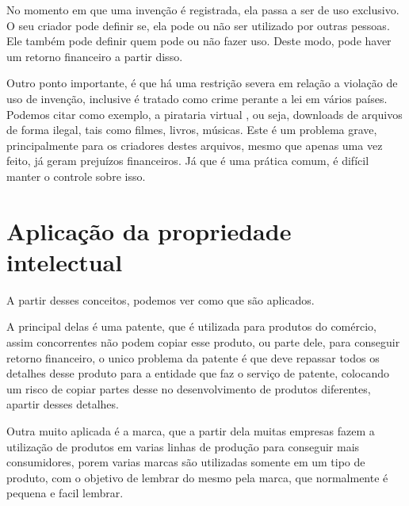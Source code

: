\documentclass[12pt]{article}
\begin{document}
No momento em que uma invenção é registrada, ela passa a ser de uso exclusivo. O seu criador pode definir se, ela pode ou não ser utilizado por outras pessoas. Ele também pode definir quem pode ou não fazer uso. Deste modo, pode haver um retorno financeiro a partir disso.

Outro ponto importante, é que há uma restrição severa em relação a violação de uso de invenção, inclusive é tratado como crime perante a lei em vários países. Podemos citar como exemplo, a pirataria virtual \cite{PIRATE}, ou seja, downloads de arquivos de forma ilegal, tais como filmes, livros, músicas. Este é um problema grave, principalmente para os criadores destes arquivos, mesmo que apenas uma vez feito, já geram prejuízos financeiros. Já que é uma prática comum, é difícil manter o controle sobre isso.

\section{Aplicação da propriedade intelectual} \label{sec:aplicacao}

A partir desses conceitos, podemos ver como que são aplicados.

A principal delas é uma patente, que é utilizada para produtos do comércio,
assim concorrentes não podem copiar esse produto, ou parte dele, para conseguir retorno
financeiro, o unico problema da patente é que deve repassar todos os detalhes desse produto
para a entidade que faz o serviço de patente, colocando um risco de copiar partes desse
no desenvolvimento de produtos diferentes, apartir desses detalhes.

Outra muito aplicada é a marca, que a partir dela muitas empresas fazem a utilização de
produtos em varias linhas de produção para conseguir mais consumidores, porem varias marcas
são utilizadas somente em um tipo de produto, com o objetivo de lembrar do mesmo pela marca,
que normalmente é pequena e facil lembrar.




\end{document}
